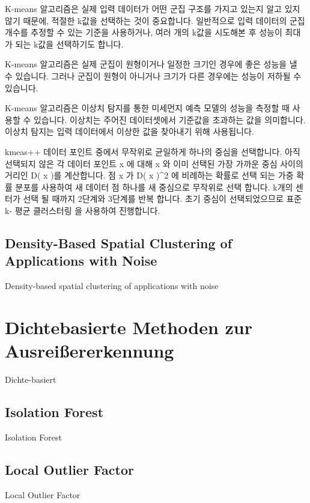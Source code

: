                 K-means 알고리즘은 실제 입력 데이터가 어떤 군집 구조를 가지고 있는지 알고 있지 않기 때문에, 적절한 k값을 선택하는 것이 중요합니다. 일반적으로 입력 데이터의 군집 개수를 추정할 수 있는 기준을 사용하거나, 여러 개의 k값을 시도해본 후 성능이 최대가 되는 k값을 선택하기도 합니다.

                K-means 알고리즘은 실제 군집이 원형이거나 일정한 크기인 경우에 좋은 성능을 낼 수 있습니다. 그러나 군집이 원형이 아니거나 크기가 다른 경우에는 성능이 저하될 수 있습니다.

                K-means 알고리즘은 이상치 탐지를 통한 미세먼지 예측 모델의 성능을 측정할 때 사용할 수 있습니다. 이상치는 주어진 데이터셋에서 기준값을 초과하는 값을 의미합니다. 이상치 탐지는 입력 데이터에서 이상한 값을 찾아내기 위해 사용됩니다.
            
                
                kmeas++
                데이터 포인트 중에서 무작위로 균일하게 하나의 중심을 선택합니다.
                아직 선택되지 않은 각 데이터 포인트 x 에 대해 x 와 이미 선택된 가장 가까운 중심 사이의 거리인 D( x )를 계산합니다.
                점 x 가 D( x )^2 에 비례하는 확률로 선택 되는 가중 확률 분포를 사용하여 새 데이터 점 하나를 새 중심으로 무작위로 선택 합니다.
                k개의 센터가 선택 될 때까지 2단계와 3단계를 반복 합니다.
                초기 중심이 선택되었으므로 표준 k- 평균 클러스터링 을 사용하여 진행합니다.
                
            \subsection{Density-Based Spatial Clustering of Applications with Noise}
                Density-based spatial clustering of applications with noise
                
        \section{Dichtebasierte Methoden zur Ausreißererkennung}
            Dichte-basiert
            
            \subsection{Isolation Forest}
                Isolation Forest
                
            \subsection{Local Outlier Factor}
                Local Outlier Factor